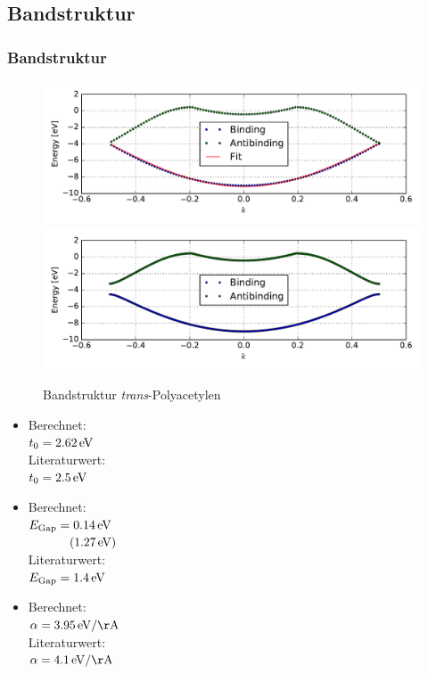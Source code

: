\subsection{Bandstruktur}
\begin{frame}
\frametitle{Bandstruktur}
\begin{minipage}{0.7\textwidth}
\begin{figure}
	\centering
	\includegraphics[width = \textwidth]{Images/polyacetylene/bandstructure/band_fit}\\
	\includegraphics[width = \textwidth]{Images/polyacetylene/bandstructure/band_manually_displaced}
	\caption{Bandstruktur \emph{trans}-Polyacetylen}
	\label{image_band_structure_relaxed_polyacetylene}
\end{figure}
\end{minipage}
\begin{minipage}{.29\textwidth}
\begin{itemize}
\setlength\itemsep{.2cm}
\item Berechnet:\\
$t_0 = \unit[2.62]{eV}$\\
Literaturwert:\\
$t_0 = \unit[2.5]{eV}$
\item Berechnet:\\
$E_\text{Gap} = \unit[0.14]{eV}$\\
$\hspace*{1.15cm}(\unit[1.27]{eV})$\\
Literaturwert:\\
$E_\text{Gap} = \unit[1.4]{eV}$
\item Berechnet:\\
$\alpha = \unit[3.95]{eV/\AA}$\\
Literaturwert:\\
$\alpha = \unit[4.1]{eV/\AA}$
\end{itemize}
\end{minipage}
\end{frame}


